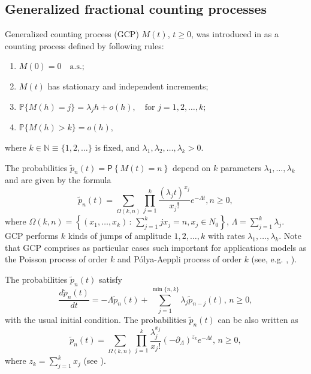 \documentclass[12pt]{article}
\theoremstyle{definition}
\theoremstyle{plain}
\newcommand{\Prob}{\mathsf{P}}
\begin{document}

\subsection{Generalized fractional counting processes}
Generalized counting process (GCP) $M(t)$, $t\ge 0$,  was introduced in \cite{DiC} as a counting process defined by following rules:
\begin{enumerate}
	\item $M(0) = 0 \quad \text{a.s.};$
	\item $M(t)$ has stationary and independent increments;
	\item $\mathbb{P}\{M(h) = j\} = \lambda_j h + o(h), \quad \text{for } j = 1, 2, \dots, k;$
	\item $\mathbb{P}\{M(h) > k\} = o(h),$
\end{enumerate}
where $k \in \mathbb{N} \equiv \{1, 2, \dots\}$ is fixed, and $\lambda_1, \lambda_2, \dots, \lambda_k > 0$. 


 The probabilities $\tilde p_n(t)=\Prob\left\{M(t)=n\right\}$  depend on $k$ parameters $\lambda_1, \ldots, \lambda_k$ and are given by the formula
\begin{equation*}
             \tilde p_n(t)=\sum_{\Omega(k,n)}^{}\prod_{j=1}^{k}\frac{\left(\lambda_j t\right)^{x_j}}{x_j!}e^{-\Lambda t}, n\geq0,\label{pnt}
\end{equation*}
where $\Omega(k,n)=\left\{(x_1,\dots,x_k)\,:\,\sum_{j=1}^{k}jx_j=n,x_j\in N_0\right\}
$, $\Lambda=\sum_{j=1}^{k}\lambda_j$. \\
GCP performs $k$ kinds of jumps of amplitude $1, 2, \ldots, k$ with rates $\lambda_1, \ldots, \lambda_k$.
Note that GCP comprises as particular cases such important for applications models as the Poisson process of order $k$ and P\'olya-Aeppli process of order $k$ (see, e.g. \cite{KK2022b}, \cite{KLS}).

The probabilities $\tilde p_n(t)$ satisfy
\begin{equation}\label{pGCP}
            \frac{d\tilde p_n(t)}{dt}=- \Lambda \tilde p_n(t) + \sum_{j=1}^{\min\{n,k\}}\lambda_j \tilde p_{n-j}(t), \, n\geq0,
\end{equation}
with the usual initial condition. 
The probabilities $\tilde p_n(t)$ can be also written as 
\begin{equation*}\label{pnt31}
             \tilde p_n(t)=\sum_{\Omega(k,n)}^{}\prod_{j=1}^{k}\frac{\lambda_j^{x_j} }{x_j!}\left(-\partial_{\Lambda}\right)^{z_k} e^{-\Lambda t}, \, n\geq0,
\end{equation*}
where 
             $z_k=\sum_{j=1}^{k}x_j$ (see \cite{KK2022Arxiv}).
             
\end{document}
